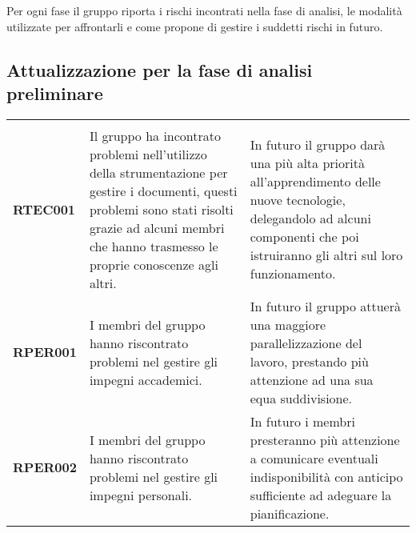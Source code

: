 \documentclass[../piano-di-progetto]{subfiles}
\begin{document}
Per ogni fase il gruppo riporta i rischi incontrati nella fase di analisi, le modalità utilizzate per affrontarli e come propone di gestire i suddetti rischi in futuro.

\subsection{Attualizzazione per la fase di analisi preliminare}%
\label{sub:attualizzazione_fase_analisi_preliminare}
\begin{longtable}[H]{|p{10em}|p{17em}|p{17em}|}
  \rowcolor{darkgray!90!}
  \multicolumn{1}{c}{\color{white}{\textbf{Rischio}}} & \multicolumn{1}{c}{\color{white}{\textbf{Gestione}}}                                                                                                                                                          & \multicolumn{1}{c}{\color{white}{\textbf{Monitoraggio}}}                                                                                                                        \\
  \textbf{RTEC001}                                    & Il gruppo ha incontrato problemi nell'utilizzo della strumentazione per gestire i documenti, questi problemi sono stati risolti grazie ad alcuni membri che hanno trasmesso le proprie conoscenze agli altri. & In futuro il gruppo darà una più alta priorità all'apprendimento delle nuove tecnologie, delegandolo ad alcuni componenti che poi istruiranno gli altri sul loro funzionamento. \\
  \textbf{RPER001}                                    & I membri del gruppo hanno riscontrato problemi nel gestire gli impegni accademici.                                                                                                                            & In futuro il gruppo attuerà una maggiore parallelizzazione del lavoro, prestando più attenzione ad una sua equa suddivisione.                                                   \\
  \textbf{RPER002}                                    & I membri del gruppo hanno riscontrato problemi nel gestire gli impegni personali.                                                                                                                             & In futuro i membri presteranno più attenzione a comunicare eventuali indisponibilità con anticipo sufficiente ad adeguare la pianificazione.                                    \\

\end{longtable}
\end{document}
